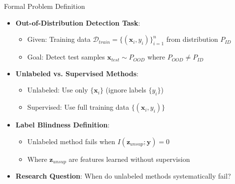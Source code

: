 \documentclass[aspectratio=169]{beamer}
\begin{document}
\begin{frame}{Formal Problem Definition}
\begin{itemize}
    \item \textbf{Out-of-Distribution Detection Task}:
    \begin{itemize}
        \item Given: Training data $\mathcal{D}_{train} = \{(\mathbf{x}_i, y_i)\}_{i=1}^n$ from distribution $P_{ID}$
        \item Goal: Detect test samples $\mathbf{x}_{test} \sim P_{OOD}$ where $P_{OOD} \neq P_{ID}$
    \end{itemize}
    \item \textbf{Unlabeled vs. Supervised Methods}:
    \begin{itemize}
        \item Unlabeled: Use only $\{\mathbf{x}_i\}$ (ignore labels $\{y_i\}$)
        \item Supervised: Use full training data $\{(\mathbf{x}_i, y_i)\}$
    \end{itemize}
    \item \textbf{Label Blindness Definition}:
    \begin{itemize}
        \item Unlabeled method fails when $I(\mathbf{z}_{unsup}; \mathbf{y}) = 0$
        \item Where $\mathbf{z}_{unsup}$ are features learned without supervision
    \end{itemize}
    \item \textbf{Research Question}: When do unlabeled methods systematically fail?
\end{itemize}
\end{frame}
\end{document}
